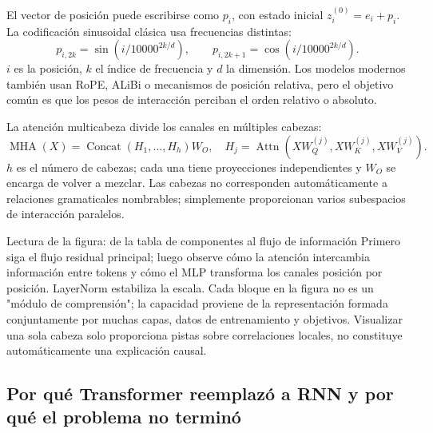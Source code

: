 
El vector de posición puede escribirse como $p_i$, con estado inicial $z_i^{(0)}=e_i+p_i$. La codificación sinusoidal clásica usa frecuencias distintas:
\[
p_{i,2k}=\sin\!\left(i/10000^{2k/d}\right),\qquad
p_{i,2k+1}=\cos\!\left(i/10000^{2k/d}\right).
\]
$i$ es la posición, $k$ el índice de frecuencia y $d$ la dimensión. Los modelos modernos también usan RoPE, ALiBi o mecanismos de posición relativa, pero el objetivo común es que los pesos de interacción perciban el orden relativo o absoluto.

La atención multicabeza divide los canales en múltiples cabezas:
\[
\operatorname{MHA}(X)=\operatorname{Concat}(H_1,\ldots,H_h)W_O,
\quad H_j=\operatorname{Attn}(XW_Q^{(j)},XW_K^{(j)},XW_V^{(j)}).
\]
$h$ es el número de cabezas; cada una tiene proyecciones independientes y $W_O$ se encarga de volver a mezclar. Las cabezas no corresponden automáticamente a relaciones gramaticales nombrables; simplemente proporcionan varios subespacios de interacción paralelos.



\begin{knowledgebox}{Lectura de la figura: de la tabla de componentes al flujo de información}
Primero siga el flujo residual principal; luego observe cómo la atención intercambia información entre tokens y cómo el MLP transforma los canales posición por posición. LayerNorm estabiliza la escala. Cada bloque en la figura no es un "módulo de comprensión"; la capacidad proviene de la representación formada conjuntamente por muchas capas, datos de entrenamiento y objetivos. Visualizar una sola cabeza solo proporciona pistas sobre correlaciones locales, no constituye automáticamente una explicación causal.
\end{knowledgebox}

\subsection{Por qué Transformer reemplazó a RNN y por qué el problema no terminó}

